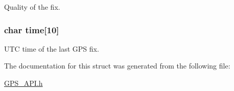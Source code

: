 Quality of the fix. 

\hypertarget{struct_g_p_s___d_a_t_a___type_def_acfe1a576562a3b99956646b40367ab4f}{}
\subsubsection[{time}]{\setlength{\rightskip}{0pt plus 5cm}char time\mbox{[}10\mbox{]}}\label{struct_g_p_s___d_a_t_a___type_def_acfe1a576562a3b99956646b40367ab4f}


U\+T\+C time of the last G\+P\+S fix. 



The documentation for this struct was generated from the following file\+:\begin{DoxyCompactItemize}
\item 
\hyperlink{_g_p_s___a_p_i_8h}{G\+P\+S\+\_\+\+A\+P\+I.\+h}\end{DoxyCompactItemize}
